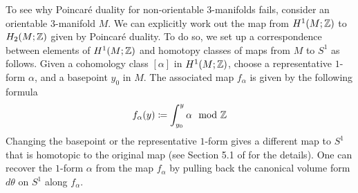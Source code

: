 To see why Poincar\'e duality for non-orientable 3-manifolds fails, consider an orientable $3$-manifold $M$. We can explicitly work out the map from
$H^1(M; \mathbb{Z})$ to $H_2(M; \mathbb{Z})$ given by Poincar\'e duality.
To do so, we set up a correspondence between elements of $H^1(M; \mathbb{Z})$ and homotopy classes of maps from
$M$ to $S^1$ as follows. Given a cohomology class $[\alpha]$ in $H^1(M; \mathbb{Z})$, choose a representative $1$-form $\alpha$,
and a basepoint $y_0$ in $M$. The associated map $f_{\alpha}$ is given by the following formula
\begin{align}\label{form:map}
  f_{\alpha}(y) \coloneqq  \int_{y_0}^y \alpha \mod {\mathbb{Z}}
\end{align}
Changing the basepoint or the representative $1$-form gives a different map to $S^1$ that is homotopic to the
original map (see Section 5.1 of \cite{calegari2007foliations} for the details). One can recover the $1$-form
$\alpha$ from the map $f_{\alpha}$ by pulling back the canonical volume form $d\theta$ on $S^1$ along $f_{\alpha}$.

